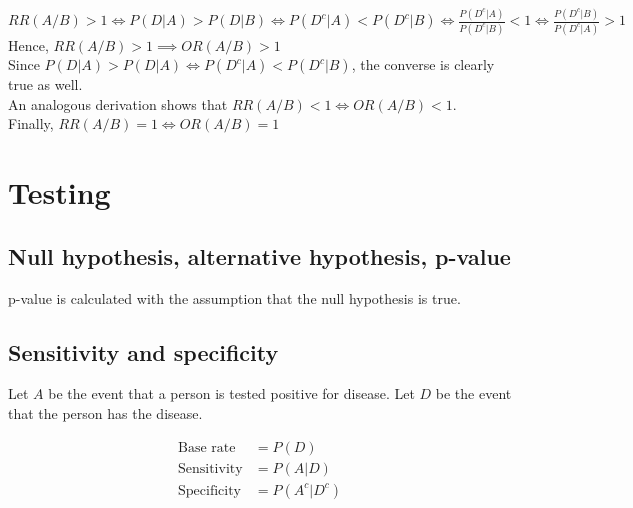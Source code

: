 \documentclass{article}
\begin{document}
$RR(A/B)>1\iff P(D|A)>P(D|B) \iff P(D^c|A)<P(D^c|B) \iff \frac{P(D^c|A)}{P(D^c|B)}<1 \iff \frac{P(D^c|B)}{P(D^c|A)}>1$\\
Hence, $RR(A/B)>1\implies OR(A/B)>1$\\
Since $P(D|A)>P(D|A)\iff P(D^c|A)<P(D^c|B)$, the converse is clearly true as well.\\
An analogous derivation shows that $RR(A/B)<1 \iff OR(A/B)<1$.\\
Finally, $RR(A/B)=1\iff OR(A/B)=1$


\section{Testing}
\subsection{Null hypothesis, alternative hypothesis, p-value}
p-value is calculated with the assumption that the null hypothesis is true.

\subsection{Sensitivity and specificity}
Let $A$ be the event that a person is tested positive for disease.
Let $D$ be the event that the person has the disease.

\begin{align*}
	\text{Base rate} &= P(D)\\
	\text{Sensitivity} &= P(A|D)\\
	\text{Specificity} &= P(A^c|D^c)
\end{align*}
\end{document}
